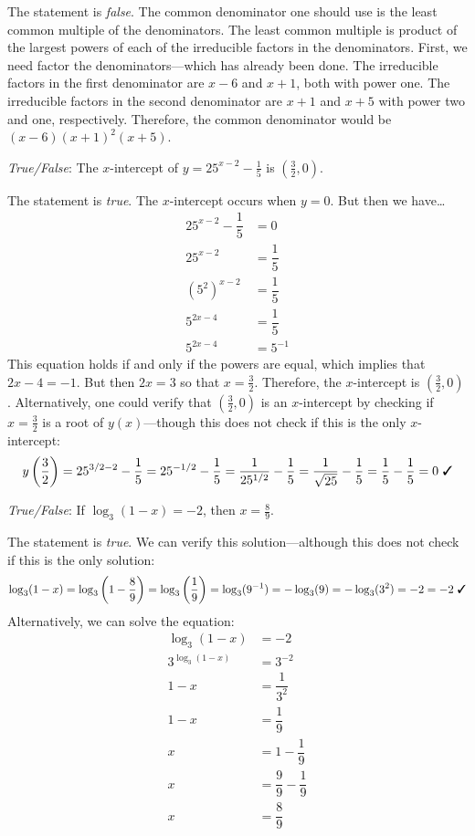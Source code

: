\documentclass[11pt,letterpaper]{article}
\begin{document}
\sol The statement is \textit{false}. The common denominator one should use is the least common multiple of the denominators. The least common multiple is product of the largest powers of each of the irreducible factors in the denominators. First, we need factor the denominators---which has already been done. The irreducible factors in the first denominator are $x - 6$ and $x + 1$, both with power one. The irreducible factors in the second denominator are $x + 1$ and $x + 5$ with power two and one, respectively. Therefore, the common denominator would be $(x - 6)(x + 1)^2 (x + 5)$. \pvspace{1.5cm}



\quizsol \textit{True/False}: The $x$-intercept of $y= 25^{x - 2} - \frac{1}{5}$ is $(\frac{3}{2}, 0)$. \pspace

\sol The statement is \textit{true}. The $x$-intercept occurs when $y= 0$. But then we have\dots
	\[
	\begin{aligned}
	25^{x - 2} - \dfrac{1}{5}&= 0 \\
	25^{x - 2}&= \dfrac{1}{5} \\
	(5^2)^{x - 2}&= \dfrac{1}{5} \\
	5^{2x - 4}&= \dfrac{1}{5} \\
	5^{2x - 4}&= 5^{-1}
	\end{aligned}
	\]
This equation holds if and only if the powers are equal, which implies that $2x - 4= -1$. But then $2x= 3$ so that $x= \frac{3}{2}$. Therefore, the $x$-intercept is $(\frac{3}{2}, 0)$. Alternatively, one could verify that $(\frac{3}{2}, 0)$ is an $x$-intercept by checking if $x= \frac{3}{2}$ is a root of $y(x)$---though this does not check if this is the only $x$-intercept:
	\[
	y \left( \frac{3}{2} \right)= 25^{3/2 - 2} - \frac{1}{5}= 25^{-1/2} - \frac{1}{5}= \dfrac{1}{25^{1/2}} - \dfrac{1}{5}= \dfrac{1}{\sqrt{25}} - \dfrac{1}{5}= \dfrac{1}{5} - \dfrac{1}{5}= 0 \text{ \cmark}
	\] \pvspace{1.5cm}



\quizsol \textit{True/False}: If $\log_3(1 - x)= -2$, then $x= \frac{8}{9}$. \pspace

\sol The statement is \textit{true}. We can verify this solution---although this does not check if this is the only solution:
	\[
	\log_3(1 - x)= \log_3\left(1 - \dfrac{8}{9} \right)= \log_3 \left(\dfrac{1}{9} \right)= \log_3(9^{-1})= -\log_3(9)= -\log_3(3^2)= -2= -2 \text{ \cmark}
	\]
Alternatively, we can solve the equation:
	\[
	\begin{aligned}
	\log_3(1 - x)&= -2 \\
	3^{\log_3(1 - x)}&= 3^{-2} \\
	1 - x&= \dfrac{1}{3^2} \\
	1 - x&= \dfrac{1}{9} \\
	x&= 1 - \dfrac{1}{9} \\
	x&= \dfrac{9}{9} - \dfrac{1}{9} \\
	x&= \dfrac{8}{9}
	\end{aligned}
	\]
\end{document}
